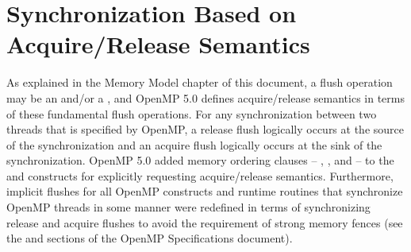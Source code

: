 \section{Synchronization Based on Acquire/Release Semantics}
\label{sec:acquire_and_release_semantics}



As explained in the Memory Model chapter of this document, a flush operation
may be an  and/or a , and OpenMP 5.0
defines acquire/release semantics in terms of these fundamental flush
operations.  For any synchronization between two threads that is specified by
OpenMP, a release flush logically occurs at the source of the synchronization
and an acquire flush logically occurs at the sink of the synchronization.
OpenMP 5.0 added memory ordering clauses -- , , and
 -- to the  and  constructs for
explicitly requesting acquire/release semantics.  Furthermore, implicit flushes
for all OpenMP constructs and runtime routines that synchronize OpenMP threads
in some manner were redefined in terms of synchronizing release and acquire
flushes to avoid the requirement of strong memory fences (see the  and  sections of the
OpenMP Specifications document).

